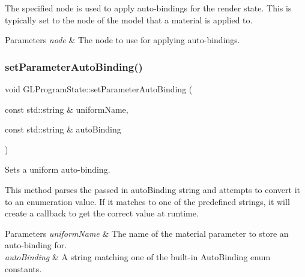 The specified node is used to apply auto-\/bindings for the render state. This is typically set to the node of the model that a material is applied to.


\begin{DoxyParams}{Parameters}
{\em node} & The node to use for applying auto-\/bindings. \\
\hline
\end{DoxyParams}
\mbox{\label{classGLProgramState_adabf77e7268bff9186c1009c3625f983}} 
\subsubsection{\texorpdfstring{set\+Parameter\+Auto\+Binding()}{setParameterAutoBinding()}\hspace{0.1cm}{\footnotesize\ttfamily [1/2]}}
{\footnotesize\ttfamily void G\+L\+Program\+State\+::set\+Parameter\+Auto\+Binding (\begin{DoxyParamCaption}\item[{const std\+::string \&}]{uniform\+Name,  }\item[{const std\+::string \&}]{auto\+Binding }\end{DoxyParamCaption})}

Sets a uniform auto-\/binding.

This method parses the passed in auto\+Binding string and attempts to convert it to an enumeration value. If it matches to one of the predefined strings, it will create a callback to get the correct value at runtime.


\begin{DoxyParams}{Parameters}
{\em uniform\+Name} & The name of the material parameter to store an auto-\/binding for. \\
\hline
{\em auto\+Binding} & A string matching one of the built-\/in Auto\+Binding enum constants. \\
\hline
\end{DoxyParams}
\mbox{\label{classGLProgramState_adabf77e7268bff9186c1009c3625f983}} 
